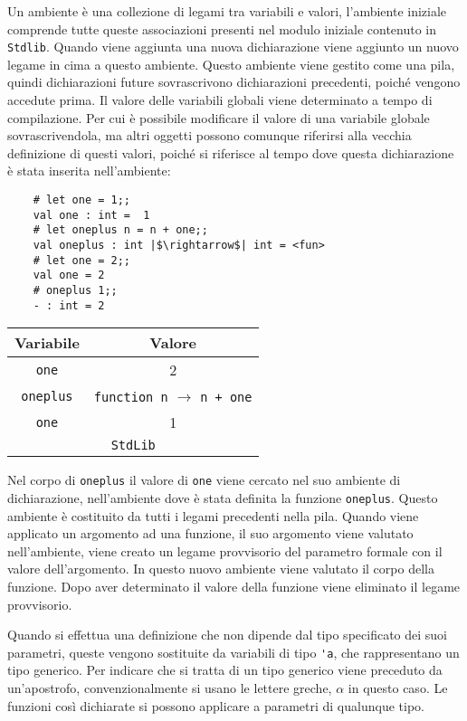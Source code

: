 \documentclass{article}
\numberwithin{equation}{subsection}
\begin{document}
Un ambiente è una collezione di legami tra variabili e valori, l'ambiente iniziale comprende tutte queste associazioni presenti nel modulo iniziale contenuto in \verb|Stdlib|. 
Quando viene aggiunta una nuova dichiarazione viene aggiunto un nuovo legame in cima a questo ambiente. Questo ambiente viene gestito come una pila, quindi dichiarazioni future sovrascrivono dichiarazioni precedenti, poiché vengono accedute prima. 
Il valore delle variabili globali viene determinato a tempo di compilazione. Per cui è possibile modificare il valore di una variabile globale sovrascrivendola, ma altri oggetti possono comunque riferirsi alla vecchia definizione di questi valori, poiché si riferisce al tempo dove questa dichiarazione è stata inserita nell'ambiente:
\begin{verbatim}
    # let one = 1;;
    val one : int =  1
    # let oneplus n = n + one;;
    val oneplus : int |$\rightarrow$| int = <fun>
    # let one = 2;;
    val one = 2
    # oneplus 1;;
    - : int = 2
\end{verbatim}
\begin{center}
    \begin{tabular}{|c|c|}
        \hline Variabile & Valore\\\hline
        \texttt{one} & 2 \\\hline
        \texttt{oneplus} & \texttt{function n} $\to$ \texttt{n + one} \\\hline
        \texttt{one} & 1 \\\hline
        \multicolumn{2}{|c|}{\texttt{StdLib}}\\\hline
    \end{tabular}
\end{center}
Nel corpo di \texttt{oneplus} il valore di \texttt{one} viene cercato nel suo ambiente di dichiarazione, nell'ambiente dove è stata definita la funzione \texttt{oneplus}. Questo ambiente è costituito da tutti i legami precedenti nella pila. 
Quando viene applicato un argomento ad una funzione, il suo argomento viene valutato nell'ambiente, viene creato un legame provvisorio del parametro formale con il valore dell'argomento. In questo nuovo ambiente viene valutato il corpo della funzione. Dopo aver determinato il valore della funzione viene eliminato il legame provvisorio. 

Quando si effettua una definizione che non dipende dal tipo specificato dei suoi parametri, queste vengono sostituite da variabili di tipo \verb|'a|, che rappresentano un tipo generico. Per indicare che si tratta di un tipo generico viene preceduto da un'apostrofo, convenzionalmente si usano le lettere greche, $\alpha$ in questo caso. Le funzioni così dichiarate si possono applicare a parametri di qualunque tipo. 
\end{document}
